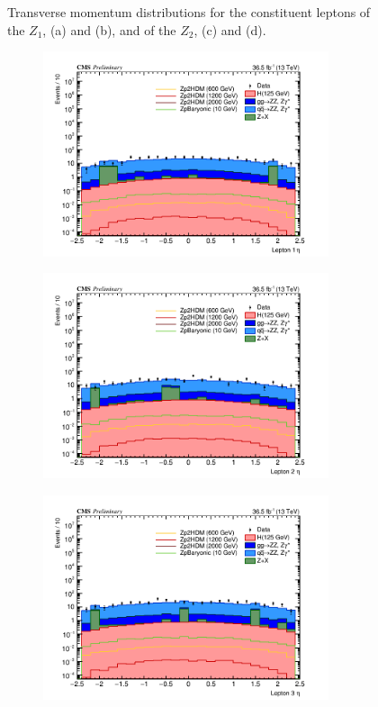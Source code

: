 \begin{enumerate}
\begin{figure}[tbh]
\begin{subfigure}{0.50\textwidth}
\caption{}
\end{subfigure}
\caption{Transverse momentum distributions for the constituent leptons of the $Z_1$, (a) and (b), and of the $Z_2$, (c) and (d).}
\label{fig:lep5kin1}
\end{figure}

\begin{figure}[tbh]
\begin{subfigure}{0.50\textwidth}
\centering
\includegraphics[width=3.3in]{figures/hist_hEtaLep1_5.png}
\caption{}
\end{subfigure}
\begin{subfigure}{0.50\textwidth}
\centering
\includegraphics[width=3.3in]{figures/hist_hEtaLep2_5.png}
\caption{}
\end{subfigure}
\begin{subfigure}{0.50\textwidth}
\centering
\includegraphics[width=3.3in]{figures/hist_hEtaLep3_5.png}

\end{subfigure}
\end{figure}
\end{enumerate}

